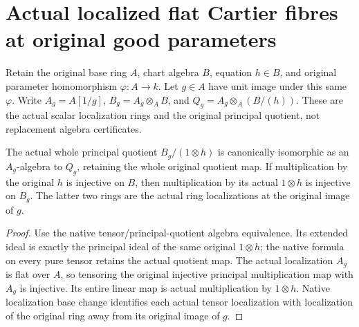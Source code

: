 \section{Actual localized flat Cartier fibres at original good parameters}

Retain the original base ring $A$, chart algebra $B$, equation $h\in B$,
and original parameter homomorphism $\varphi:A\to k$.  Let $g\in A$ have
unit image under this same $\varphi$.  Write $A_g=A[1/g]$,
$B_g=A_g\otimes_A B$, and $Q_g=A_g\otimes_A(B/(h))$.
These are the actual scalar localization rings and the original principal
quotient, not replacement algebra certificates.

\begin{lemma}
\label{lem:kn-nadel-bertini-snc-flat-localized-quotient}
\leanok
The actual whole principal quotient $B_g/(1\otimes h)$ is canonically
isomorphic as an $A_g$-algebra to $Q_g$, retaining the whole original
quotient map.  If multiplication by the original $h$ is injective on $B$,
then multiplication by its actual $1\otimes h$ is injective on $B_g$.
The latter two rings are the actual ring localizations at the original
image of $g$.
\end{lemma}
\begin{proof}
Use the native tensor/principal-quotient algebra equivalence.  Its extended
ideal is exactly the principal ideal of the same original $1\otimes h$;
the native formula on every pure tensor retains the actual quotient map.
The actual localization $A_g$ is flat over $A$, so tensoring the original
injective principal multiplication map with $A_g$ is injective.  Its entire
linear map is actual multiplication by $1\otimes h$.  Native localization
base change identifies each actual tensor localization with localization
of the original ring away from its original image of $g$.
\end{proof}


